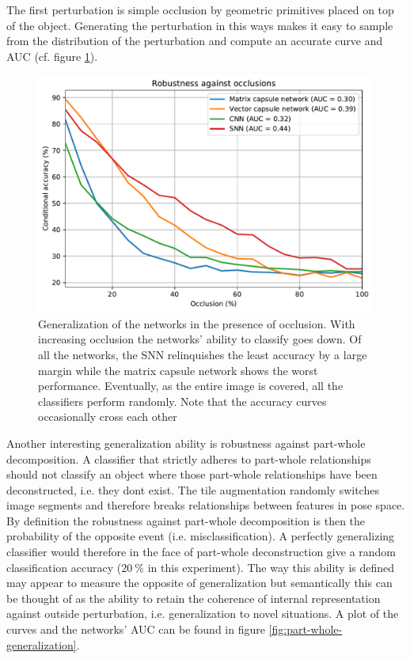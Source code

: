 The first perturbation is simple occlusion by geometric primitives placed on top of the object. Generating the perturbation in this ways makes it easy to sample from the distribution of the perturbation and compute an accurate curve and AUC (cf. figure \ref{fig:occlusion-generalization}).
\begin{figure}[H]
    \centering
\includegraphics[width=\textwidth]{figures/occlusion.pdf}
\caption[Generalization of the networks in the presence of occlusion]{Generalization of the networks in the presence of occlusion. With increasing occlusion the networks' ability to classify goes down. Of all the networks, the SNN relinquishes the least accuracy by a large margin while the matrix capsule network shows the worst performance. Eventually, as the entire image is covered, all the classifiers perform randomly. Note that the accuracy curves occasionally cross each other}\label{fig:occlusion-generalization}
\end{figure}\noindent
Another interesting generalization ability is robustness against part-whole decomposition. A classifier that strictly adheres to part-whole relationships should not classify an object where those part-whole relationships have been deconstructed, i.e. they dont exist. The tile augmentation randomly switches image segments and therefore breaks relationships between features in pose space. By definition the robustness against part-whole decomposition is then the probability of the opposite event (i.e. misclassification). A perfectly generalizing classifier would therefore in the face of part-whole deconstruction give a random classification accuracy ($\SI{20}{\percent}$ in this experiment). The way this ability is defined may appear to measure the opposite of generalization but semantically this can be thought of as the ability to retain the coherence of internal representation against outside perturbation, i.e. generalization to novel situations. A plot of the curves and the networks' AUC can be found in figure \ref{fig:part-whole-generalization}.
